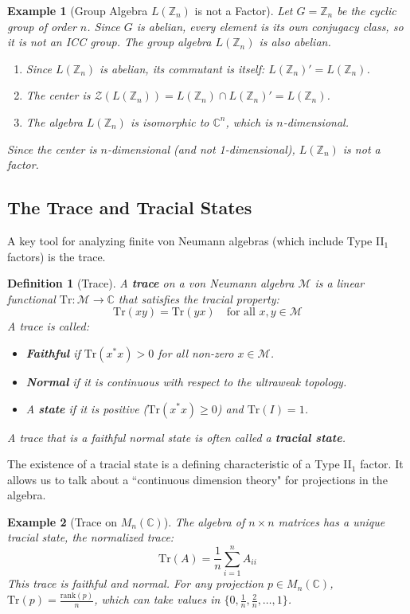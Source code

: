 \documentclass[11pt, a4paper]{article}
\theoremstyle{colored_def}
\newtheorem{definition}{Definition}[section]
\theoremstyle{colored_thm}
\theoremstyle{colored_ex}
\newtheorem{example}{Example}[section]
\newcommand{\C}{\mathbb{C}}
\newcommand{\Tr}{\text{Tr}}
\newcommand{\M}{\mathcal{M}}
\newcommand{\Z}{\mathcal{Z}}
\begin{document}
\begin{example}[Group Algebra $L(\mathbb{Z}_n)$ is not a Factor]\label{ex:LZn}
Let $G = \mathbb{Z}_n$ be the cyclic group of order $n$. Since $G$ is abelian, every element is its own conjugacy class, so it is not an ICC group. The group algebra $L(\mathbb{Z}_n)$ is also abelian.
\begin{enumerate}
    \item Since $L(\mathbb{Z}_n)$ is abelian, its commutant is itself: $L(\mathbb{Z}_n)' = L(\mathbb{Z}_n)$.
    \item The center is $\Z(L(\mathbb{Z}_n)) = L(\mathbb{Z}_n) \cap L(\mathbb{Z}_n)' = L(\mathbb{Z}_n)$.
    \item The algebra $L(\mathbb{Z}_n)$ is isomorphic to $\C^n$, which is $n$-dimensional.
\end{enumerate}
Since the center is $n$-dimensional (and not 1-dimensional), $L(\mathbb{Z}_n)$ is not a factor.
\end{example}

\subsection{The Trace and Tracial States}

A key tool for analyzing finite von Neumann algebras (which include Type II$_1$ factors) is the trace.

\begin{definition}[Trace]
A \textbf{trace} on a von Neumann algebra $\M$ is a linear functional $\Tr: \M \to \C$ that satisfies the tracial property:
$$ \Tr(xy) = \Tr(yx) \quad \text{for all } x, y \in \M $$
A trace is called:
\begin{itemize}
    \item \textbf{Faithful} if $\Tr(x^*x) > 0$ for all non-zero $x \in \M$.
    \item \textbf{Normal} if it is continuous with respect to the ultraweak topology.
    \item A \textbf{state} if it is positive ($\Tr(x^*x) \geq 0$) and $\Tr(I) = 1$.
\end{itemize}
A trace that is a faithful normal state is often called a \textbf{tracial state}.
\end{definition}

The existence of a tracial state is a defining characteristic of a Type II$_1$ factor. It allows us to talk about a ``continuous dimension theory" for projections in the algebra.

\begin{example}[Trace on $M_n(\C)$]
The algebra of $n \times n$ matrices has a unique tracial state, the normalized trace:
$$ \Tr(A) = \frac{1}{n} \sum_{i=1}^n A_{ii} $$
This trace is faithful and normal. For any projection $p \in M_n(\C)$, $\Tr(p) = \frac{\text{rank}(p)}{n}$, which can take values in $\{0, \frac{1}{n}, \frac{2}{n}, \dots, 1\}$.
\end{example}
\end{document}

